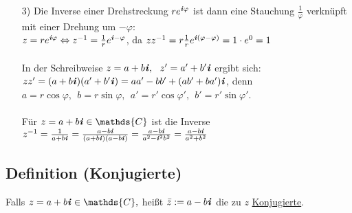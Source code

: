 \documentclass[a4paper, 12pt,titlepage, pdf, headsepline]{scrartcl}
\newcommand{\C}{\mathds{C}}
\newcommand{\uline}[1]{\underline{#1}}
\newcommand*\colvec[1]{
	\global\colveccount#1
	\begin{pmatrix}
		\colvecnext
	}
\def\colvecnext#1{
		#1
		\global\advance\colveccount-1
		\ifnum\colveccount>0
		\\
		\expandafter\colvecnext
		\else
	\end{pmatrix}
	\fi
}
\renewcommand{\i}{\textbf{\textit{i}}}
\renewcommand{\>}{\rightarrow}
\renewcommand{\*}{\cdot}
\renewcommand{\phi}{\varphi}
\renewcommand{\vec}[1]{\colvec{#1}}
\begin{document}
\begin{itemize}
\begin{minipage}[c]{0.45\textwidth}
		      				      \end{minipage}
		      				\item[3)] Die Inverse einer Drehstreckung $re^{\i\phi}$ ist dann eine Stauchung $\frac{1}{\phi}$ verknüpft mit einer Drehung um $-\phi:$\\
		      				      $z = re^{\i\phi} \Leftrightarrow z^{-1} = \frac{1}{r} e^{\i-\phi}$, da $zz^{-1} = r \frac{1}{r} e^{\i(\phi - \phi)} = 1 \cdot e^0 = 1$\\
		      				      \\
		      				      In der Schreibweise $z= a+b\i,~~ z' = a' + b'\i$ ergibt sich:\\ $zz' = (a +b\i)(a' + b'\i) = aa' -bb' + (ab' + ba')\i$, denn \\$a = r \cos \phi,~~ b= r \sin\phi,~~ a' = r' \cos\phi',~~ b' = r' \sin\phi'$.\\ \\
		      				      Für $z = a +b\i \in \C$ ist die Inverse\\ $z^{-1} = \frac{1}{a+b\i} = \frac{a -b\i}{(a+ b\i)(a -b\i)}= \frac{a-b\i}{a^2 - \i^2 b^2} = \frac{a-b\i}{a^2 +b^2}$
		      			\end{itemize}
		      			\subsection{Definition (Konjugierte)}
		      			Falls $z = a+b\i \in \C,$ heißt $\bar{z} := a-b\i$ die zu $z$ \uline{Konjugierte}.
		      				
\end{document}
